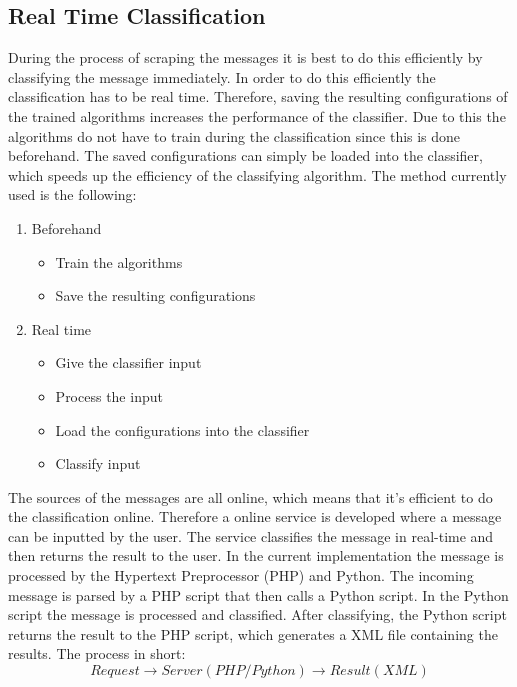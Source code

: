 \documentclass[11pt]{article}
\begin{document}
\subsection{Real Time Classification}
During the process of scraping the messages it is best to do this efficiently by classifying the message immediately. In order to do this efficiently the classification has to be real time. Therefore, saving the resulting configurations of the trained algorithms increases the performance of the classifier. Due to this the algorithms do not have to train during the classification since this is done beforehand. The saved configurations can simply be loaded into the classifier, which speeds up the efficiency of the classifying algorithm. The method currently used is the following:
\begin{enumerate}
\item Beforehand
\begin{itemize}
\item Train the algorithms
\item Save the resulting configurations
\end{itemize}
\item Real time
\begin{itemize}
\item Give the classifier input
\item Process the input
\item Load the configurations into the classifier
\item Classify input
\end{itemize}
\end{enumerate}
The sources of the messages are all online, which means that it’s efficient to do the classification online. Therefore a online service is developed where a message can be inputted by the user. The service classifies the message in real-time and then returns the result to the user. In the current implementation the message is processed by the Hypertext Preprocessor (PHP) and Python. The incoming message is parsed by a PHP script that then calls a Python script. In the Python script the message is processed and classified. After classifying, the Python script returns the result to the PHP script, which generates a XML file containing the results. The process in short:
\begin{equation}
Request \rightarrow Server (PHP/Python) \rightarrow Result (XML)
\end{equation}
\end{document}
